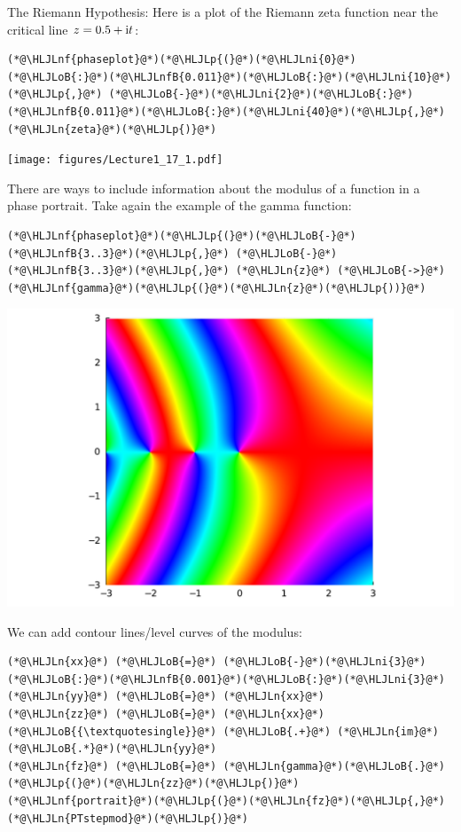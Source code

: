 \documentclass[12pt,a4paper]{article}
\newcommand{\HLJLn}[1]{#1}
\newcommand{\HLJLnf}[1]{\textcolor[RGB]{66,102,213}{#1}}
\newcommand{\HLJLnfB}[1]{\textcolor[RGB]{59,151,46}{#1}}
\newcommand{\HLJLni}[1]{\textcolor[RGB]{59,151,46}{#1}}
\newcommand{\HLJLoB}[1]{\textcolor[RGB]{102,102,102}{\textbf{#1}}}
\newcommand{\HLJLp}[1]{#1}
\def\I{ {\rm i} }
\begin{document}
The Riemann Hypothesis: Here is a plot of the Riemann zeta function near the critical line $z = 0.5 + \I t$:


\begin{lstlisting}
(*@\HLJLnf{phaseplot}@*)(*@\HLJLp{(}@*)(*@\HLJLni{0}@*)(*@\HLJLoB{:}@*)(*@\HLJLnfB{0.011}@*)(*@\HLJLoB{:}@*)(*@\HLJLni{10}@*)(*@\HLJLp{,}@*) (*@\HLJLoB{-}@*)(*@\HLJLni{2}@*)(*@\HLJLoB{:}@*)(*@\HLJLnfB{0.011}@*)(*@\HLJLoB{:}@*)(*@\HLJLni{40}@*)(*@\HLJLp{,}@*) (*@\HLJLn{zeta}@*)(*@\HLJLp{)}@*)
\end{lstlisting}

\texttt{[image: figures/Lecture1\_17\_1.pdf]}

There are ways to include information about the modulus of a function in a phase portrait. Take again the example of the gamma function:


\begin{lstlisting}
(*@\HLJLnf{phaseplot}@*)(*@\HLJLp{(}@*)(*@\HLJLoB{-}@*)(*@\HLJLnfB{3..3}@*)(*@\HLJLp{,}@*) (*@\HLJLoB{-}@*)(*@\HLJLnfB{3..3}@*)(*@\HLJLp{,}@*) (*@\HLJLn{z}@*) (*@\HLJLoB{->}@*) (*@\HLJLnf{gamma}@*)(*@\HLJLp{(}@*)(*@\HLJLn{z}@*)(*@\HLJLp{))}@*)
\end{lstlisting}

\includegraphics[width=\linewidth]{figures/Lecture1_18_1.pdf}

We can add contour lines/level curves of the modulus:


\begin{lstlisting}
(*@\HLJLn{xx}@*) (*@\HLJLoB{=}@*) (*@\HLJLoB{-}@*)(*@\HLJLni{3}@*)(*@\HLJLoB{:}@*)(*@\HLJLnfB{0.001}@*)(*@\HLJLoB{:}@*)(*@\HLJLni{3}@*)
(*@\HLJLn{yy}@*) (*@\HLJLoB{=}@*) (*@\HLJLn{xx}@*)
(*@\HLJLn{zz}@*) (*@\HLJLoB{=}@*) (*@\HLJLn{xx}@*)(*@\HLJLoB{{\textquotesingle}}@*) (*@\HLJLoB{.+}@*) (*@\HLJLn{im}@*)(*@\HLJLoB{.*}@*)(*@\HLJLn{yy}@*)
(*@\HLJLn{fz}@*) (*@\HLJLoB{=}@*) (*@\HLJLn{gamma}@*)(*@\HLJLoB{.}@*)(*@\HLJLp{(}@*)(*@\HLJLn{zz}@*)(*@\HLJLp{)}@*)
(*@\HLJLnf{portrait}@*)(*@\HLJLp{(}@*)(*@\HLJLn{fz}@*)(*@\HLJLp{,}@*) (*@\HLJLn{PTstepmod}@*)(*@\HLJLp{)}@*)
\end{lstlisting}
\end{document}
